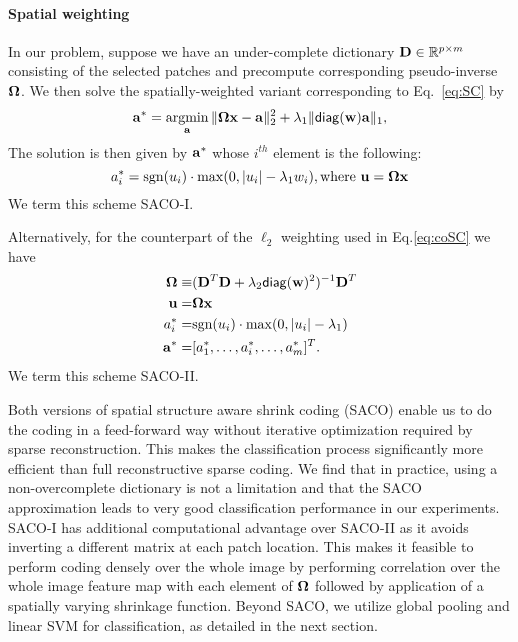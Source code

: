 \documentclass[10pt,twocolumn,letterpaper]{article}
\def\a{{\bf a}}
\def\D{{\bf D}}
\def\x{{\bf x}}
\def\u{{\bf u}}
\def\w{{\bf w}}
\def\RB{{\mathbb R}}
\def\argmin{\mathop{\rm argmin}}
\def\diag{\mathsf{diag}}
\begin{document}
\paragraph{Spatial weighting}
In our problem, suppose we have an under-complete dictionary $\D \in
\RB^{p\times m}$ consisting of the selected patches and precompute
corresponding pseudo-inverse ${\bf \Omega}$.  We then solve the
spatially-weighted variant corresponding to Eq.~\ref{eq:SC} by
\begin{equation}
\a^*= \argmin_{\a}\Vert {\bf \Omega}\x - \a \Vert_2^2 + \lambda_1 \Vert \diag(\w) \a \Vert_1,
\end{equation}
The solution is then given by $\a^*$ whose $i^{th}$ element is the following:
\begin{equation}
a_i^* =  \text{sgn}( u_i) \cdot  \max(0, \vert u_i\vert -\lambda_1w_i), \text{where } \u={\bf \Omega}\x
\end{equation}
We term this scheme SACO-I.

Alternatively, for the counterpart of the $\ell_2$ weighting used in
Eq.\ref{eq:coSC} we have
\begin{equation}
\begin{split}
{\bf \Omega} \equiv & (\D^T \D + \lambda_2\diag(\w)^2) ^{-1}\D^T \\
\u = & {\bf \Omega}\x \\
a_i^* = & \text{sgn}( u_i ) \cdot \max(0, \vert u_i\vert -\lambda_1)\\
\a^* = &[a_1^*, \dots, a_i^*, \dots, a_m^*]^T.
\end{split}
\label{eq:variant2}
\end{equation}
We term this scheme SACO-II.


Both versions of spatial structure aware shrink coding (SACO) enable us to do
the coding in a feed-forward way without iterative optimization required by
sparse reconstruction. This makes the classification process significantly
more efficient than full reconstructive sparse coding.  We find that in
practice, using a non-overcomplete dictionary is not a limitation and that the
SACO approximation leads to very good classification performance in our
experiments.  SACO-I has additional computational advantage over SACO-II
as it avoids inverting a different matrix at each patch location. This
makes it feasible to perform coding densely over the whole image by performing
correlation over the whole image feature map with each element of ${\bf \Omega}$
followed by application of a spatially varying shrinkage function.
Beyond SACO, we utilize global pooling and linear SVM for classification,
as detailed in the next section.
\end{document}

